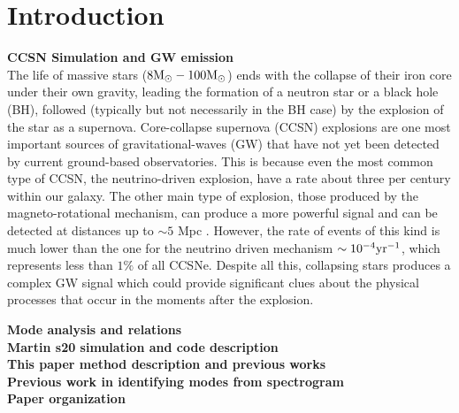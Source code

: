 \section{Introduction}


\textbf{CCSN Simulation and GW emission}\\
The life of massive stars ($8 {\rm M}_\odot-100{\rm M}_\odot$) ends with the collapse of their iron core under their own gravity, leading the formation of a neutron star or a black hole (BH), followed (typically but not necessarily in the BH case)  by the explosion of the star as a supernova. Core-collapse supernova (CCSN) explosions are one most important sources of gravitational-waves (GW) that have not yet been detected by current ground-based observatories. This is because even the most common type of CCSN, the neutrino-driven explosion, have a rate about three per century \cite{Gossan:2016} within our galaxy. The other main type of explosion, those produced by the magneto-rotational mechanism, can produce a more powerful signal and can be detected at distances up to $\sim 5$ Mpc \cite{Gossan:2016}. However, the rate of events of this kind is much lower than the one for the neutrino driven mechanism $\sim 10^{-4} \rm{yr}^{-1}$, which represents less than $1 \%$ of all CCSNe.
Despite all this, collapsing stars produces a complex GW signal which could provide significant clues about the physical processes that occur in the moments after the explosion. 


\textbf{Mode analysis and relations}\\
\textbf{Martin s20 simulation and code description}\\
\textbf{This paper method description and previous works}\\
\textbf{Previous work in identifying modes from spectrogram}\\
\textbf{Paper organization}\\
